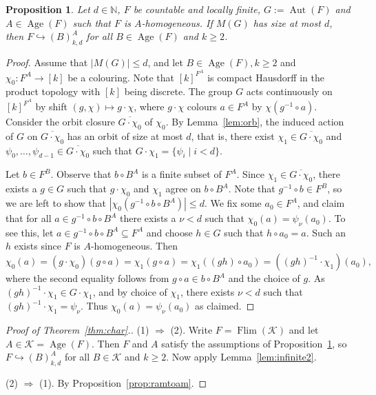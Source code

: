 \documentclass[12pt]{amsart}
\theoremstyle{plain}
\newtheorem{proposition}[theorem]{Proposition}
\theoremstyle{definition}
\begin{document}
\begin{proposition} \label{prop:amtoram}
Let $d\in{\mathbb N}$, $F$ be countable and locally finite, $G:=\operatorname{Aut}(F)$ and $A\in\operatorname{Age}(F)$ such that
$F$ is $A$-homogeneous. If $M(G)$ has size at most $d$, then $F\hookrightarrow (B)^A_{k,d}$ for all $B\in\operatorname{Age}(F)$ and $k\ge 2$.
\end{proposition}

\begin{proof} Assume that $|M(G)|\le d$, and let $B\in\operatorname{Age}(F),k\ge 2$ and $\chi_0:F^A\to [k]$ be a colouring. 
Note that $[k]^{F^A}$ is compact Hausdorff in the product topology with $[k]$ being discrete. 
The group $G$  acts continuously on $[k]^{F^A}$ by shift
$(g,\chi)\mapsto g\cdot \chi$, where $g\cdot\chi$ colours $a\in F^A$ by $\chi(g^{-1}\circ a)$. 
Consider the orbit closure $\overline{G\cdot \chi_0}$ of $\chi_0$. 
By Lemma~\ref{lem:orb}, 
the induced action of $G$ on $\overline{G\cdot \chi_0}$ has an orbit of size at most $d$, that is,
there exist $\chi_1\in \overline{G\cdot \chi_0}$ and $\psi_0,\ldots,\psi_{d-1}\in \overline{G\cdot \chi_0}$ such that
$G\cdot \chi_1=\{\psi_i\mid i<d\}$. 

Let $b\in F^B$. Observe that $b\circ B^A$ is a finite subset of $F^A$.
Since $\chi_1\in \overline{G\cdot \chi_0}$, there exists a 
$g\in G$ such that $g\cdot \chi_0$ and $\chi_1$ agree on $b\circ B^A$. Note that $g^{-1}\circ b\in F^{B}$, so we are left to show that $|\chi_0(g^{-1}\circ b\circ  B^A)|\le d$. We fix some $a_0\in F^A$, and claim that
for all $a\in g^{-1}\circ b\circ  B^A$ there exists a $\nu<d$ such that $\chi_0(a)=\psi_\nu(a_0)$. 
To see this, let $a\in g^{-1}\circ b\circ B^A\subseteq F^A$ and choose $h\in G$ 
such that $h\circ a_0=a$. Such an $h$ exists since $F$ is $A$-homogeneous. Then
$$
\chi_0(a)= (g\cdot\chi_0)(g\circ a)=\chi_1(g\circ a)= \chi_1((gh)\circ a_0) =((gh)^{-1}\cdot \chi_1)(a_0),
$$ 
where the second equality follows from  $g\circ a \in b\circ B^A$ and the choice of $g$.
As $(gh)^{-1}\cdot \chi_1\in G\cdot \chi_1$, and by choice of $\chi_1$, there exists $\nu<d$ 
such that $(gh)^{-1}\cdot \chi_1=\psi_\nu$. Thus 
$\chi_0(a)=\psi_\nu(a_0)$ as claimed.\end{proof}

\begin{proof}[Proof of Theorem~\ref{thm:char}.]
(1) $\Rightarrow$ (2). Write $F=\operatorname{Flim}({\mathcal K})$ and let $A\in{\mathcal K}=\operatorname{Age}(F)$. Then $F$ and $A$ satisfy the assumptions of Proposition~\ref{prop:amtoram}, so $F\hookrightarrow(B)^A_{k,d}$ for all $B\in{\mathcal K}$ and $k\ge 2$. Now apply Lemma~\ref{lem:infinite2}.

(2) $\Rightarrow$ (1). By Proposition~\ref{prop:ramtoam}.
\end{proof}
\end{document}
